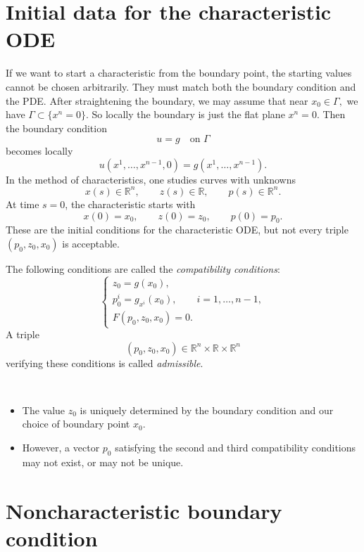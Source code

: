 \section{Initial data for the characteristic ODE}

If we want to start a characteristic from the boundary point, the starting values cannot be chosen arbitrarily. They must match both the boundary condition and the PDE.
After straightening the boundary, we may assume that near
$
x_0\in \Gamma,
$
we have
$
\Gamma\subset \{x^n=0\}.
$
So locally the boundary is just the flat plane $x^n=0$.
Then the boundary condition
$$
u=g \quad \text{on } \Gamma
$$
becomes locally
$$
u(x^1,\ldots,x^{n-1},0)
=
g(x^1,\ldots,x^{n-1}).
$$
In the method of characteristics, one studies curves with unknowns
$$
x(s)\in \mathbb{R}^n,
\qquad
z(s)\in \mathbb{R},
\qquad
p(s)\in \mathbb{R}^n.
$$
At time $s=0$, the characteristic starts with
$$
x(0)=x_0,\qquad z(0)=z_0,\qquad p(0)=p_0.
$$
These are the initial conditions for the characteristic ODE, but not every triple
$
(p_0,z_0,x_0)
$
is acceptable.

\begin{definition}
The following conditions are called the \emph{compatibility conditions}:
$$
\begin{cases}
z_0=g(x_0),\\
p_0^i=g_{x^i}(x_0), \qquad i=1,\ldots,n-1,\\
F(p_0,z_0,x_0)=0.
\end{cases}
$$
A triple
$$
(p_0,z_0,x_0)\in \mathbb{R}^n\times \mathbb{R}\times \mathbb{R}^n
$$
verifying these conditions is called \emph{admissible}.
\end{definition}

\begin{remark}\
    \begin{itemize}
        \item The value $z_0$ is uniquely determined by the boundary condition and our choice of boundary point $x_0$.
        \item However, a vector $p_0$ satisfying the second and third compatibility conditions may not exist, or may not be unique.
    \end{itemize}
\end{remark}

\section{Noncharacteristic boundary condition}

